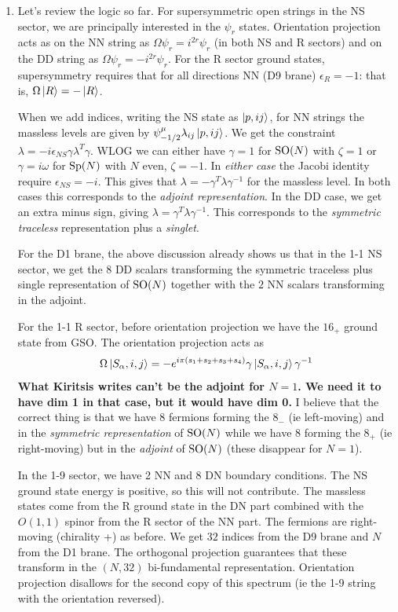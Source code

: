 \documentclass[11pt, class=article, crop=false]{standalone}
\begin{document}
\begin{enumerate}
	\item Let's review the logic so far. For supersymmetric open strings in the NS sector, we are principally interested in the $\psi_r$ states. Orientation projection acts as on the NN string as $\Omega \psi_r = i^{2r} \psi_r$ (in both NS and R sectors) and on the DD string as $\Omega \psi_r = - i^{2r} \psi_r$. For the R sector ground states, supersymmetry requires that for all directions NN (D9 brane) $\epsilon_R = -1$: that is, $\Omega \ket{R} = - \ket{R}$. 
	
	When we add indices, writing the NS state as $\ket{p, ij}$, for NN strings the massless levels are given by $\psi_{-1/2}^\mu \lambda_{ij} \ket{p, ij}$. We get the constraint $\lambda = -i \epsilon_{NS} \gamma \lambda^T \gamma$. WLOG we can either have $\gamma = 1$ for $\mathrm{SO}(N)$ with $\zeta = 1$ or $\gamma = i \omega$ for $\mathrm{Sp}(N)$ with $N$ even, $\zeta = -1$. In \emph{either case} the Jacobi identity require $\epsilon_{NS} = - i$. This gives that $\lambda = - \gamma^T \lambda \gamma^{-1}$ for the massless level. In both cases this corresponds to the \emph{adjoint representation}. In the DD case, we get an extra minus sign, giving $\lambda = \gamma^T \lambda \gamma^{-1}$. This corresponds to the \emph{symmetric traceless} representation plus a \emph{singlet}.
	
	For the D1 brane, the above discussion already shows us that in the 1-1 NS sector, we get the $8$ DD scalars transforming the symmetric traceless plus single representation of $\mathrm{SO}(N)$ together with the $2$ NN scalars transforming in the adjoint. 
	
	For the 1-1 R sector, before orientation projection we have the $16_+$ ground state from GSO. The orientation projection acts as
	\[
		\Omega \ket{S_\alpha, i, j} = - e^{i \pi (s_1 + s_2 + s_3 + s_4)} \gamma \ket{S_\alpha, i, j} \gamma^{-1}
	\]
	\textbf{What Kiritsis writes can't be the adjoint for $N=1$. We need it to have dim 1 in that case, but it would have dim 0.} I believe that the correct thing is that we have 8 fermions forming the $8_-$ (ie left-moving) and in the \emph{symmetric representation} of $\mathrm{SO}(N)$ while we have 8 forming the $8_+$ (ie right-moving) but in the \emph{adjoint} of $\mathrm{SO}(N)$ (these disappear for $N = 1$).
	
	In the 1-9 sector, we have 2 NN and 8 DN boundary conditions. The NS ground state energy is positive, so this will not contribute. The massless states come from the R ground state in the DN part combined with the $O(1,1)$ spinor from the R sector of the NN part. The fermions are right-moving (chirality +) as before. We get $32$ indices from the D9 brane and $N$ from the D1 brane. The orthogonal projection guarantees that these transform in the $(N, 32)$ bi-fundamental representation. Orientation projection disallows for the second copy of this spectrum (ie the 1-9 string with the orientation reversed).
	

\end{enumerate}
\end{document}
